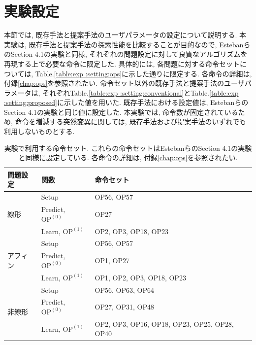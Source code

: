\documentclass[11pt,oneside,openany,report]{jsbook}
\begin{document}
\section{実験設定}\label{sec:proposed:exp:setting}

本節では, 既存手法と提案手法のユーザパラメータの設定について説明する. 本実験は, 既存手法と提案手法の探索性能を比較することが目的なので, EstebanらのSection 4.1の実験と同様, それぞれの問題設定に対して良質なアルゴリズムを再現する上で必要な命令に限定した\cite{automl_zero}. 具体的には, 各問題に対する命令セットについては, Table.\ref{table:exp
:setting:ops}に示した通りに限定する. 各命令の詳細は, 付録\ref{chap:ops}を参照されたい. 命令セット以外の既存手法と提案手法のユーザパラメータは, それぞれTable.\ref{table:exp
:setting:conventional}とTable.\ref{table:exp
:setting:proposed}に示した値を用いた. 既存手法における設定値は, EstebanらのSection 4.1の実験と同じ値に設定した\cite{automl_zero}. 本実験では, 命令数が固定されているため, 命令を増減する突然変異に関しては, 既存手法および提案手法のいずれでも利用しないものとする.

\begin{table}[tbp]
  \caption{実験で利用する命令セット. これらの命令セットはEstebanらのSection 4.1の実験と同様に設定している\cite{automl_zero}. 各命令の詳細は, 付録\ref{chap:ops}を参照されたい.}
  \label{table:exp
  :setting:ops}
  \centering
  \begin{tabular}{|l|l|l|}
    \hline
    問題設定 & 関数 & 命令セット \\
    \hline
    \hline
    \multirow{3}{*}{線形}
    & Setup &  OP56, OP57 \\
    & Predict, $\mathrm{OP}^{(0)}$ & OP27  \\
    & Learn, $\mathrm{OP}^{(1)}$ &  OP2, OP3, OP18, OP23 \\
    \hline
    \multirow{3}{*}{アフィン}
    & Setup &  OP56, OP57 \\
    & Predict, $\mathrm{OP}^{(0)}$ & OP1, OP27  \\
    & Learn, $\mathrm{OP}^{(1)}$&  OP1, OP2, OP3, OP18,
    OP23 \\
    \hline
    \multirow{3}{*}{非線形}
    & Setup & OP56, OP63, OP64 \\
    & Predict, $\mathrm{OP}^{(0)}$ & OP27, OP31, OP48 \\
    & Learn, $\mathrm{OP}^{(1)}$& OP2, OP3, OP16, OP18, OP23, OP25, OP28, OP40  \\
    \hline
  \end{tabular}
\end{table}
\end{document}
